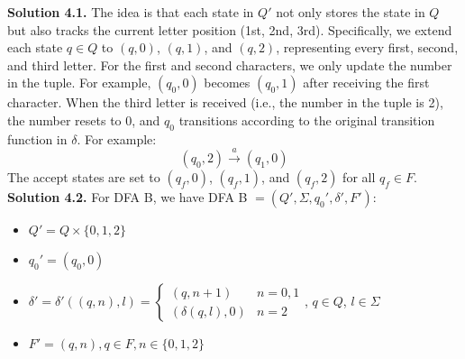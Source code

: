 \documentclass[12pt]{article}
\newcommand{\solution}[1]{\noindent \textbf{Solution #1.}}
\begin{document}
\solution{4.1} 
The idea is that each state in \( Q' \) not only stores the state in \( Q \) but also tracks the current letter position (1st, 2nd, 3rd). Specifically, we extend each state \( q \in Q \) to \( (q,0) \), \( (q,1) \), and \( (q,2) \), representing every first, second, and third letter. For the first and second characters, we only update the number in the tuple. For example, \( (q_0,0) \) becomes \( (q_0,1) \) after receiving the first character. When the third letter is received (i.e., the number in the tuple is 2), the number resets to 0, and \( q_0 \) transitions according to the original transition function in $\delta$. For example:
\[
(q_0,2) \xrightarrow{a} (q_1,0)
\]
The accept states are set to \( (q_f, 0) \), \( (q_f, 1) \), and \( (q_f, 2) \) for all \( q_f \in F \).\\



\solution{4.2} 
For DFA B, we have DFA B $= (Q',\Sigma,q_0',\delta',F')$:

\begin{itemize}
  \item $Q' = Q \times \{0,1,2\}$
  \item $q_0' = (q_0,0)$
  \item $\delta' = \delta'((q,n),l) = \left\{
      \begin{array}{ll}
      \text{$(q,n+1)$} & \text{$n = 0,1$} \\
      \text{$(\delta(q,l),0)$} & \text{$n = 2$}
      \end{array}
      \right.$, $q \in Q$, $l \in \Sigma$
  \item $F' = (q,n),q \in F,n \in \{0,1,2\}$

\end{itemize}
\end{document}
